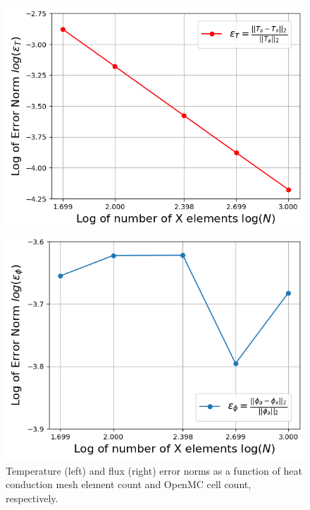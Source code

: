 \documentclass[letterpaper]{mc2023}
\begin{document}
\begin{figure}[H]
    \centering
    \begin{minipage}[b]{0.485\linewidth}
        \includegraphics[width=\linewidth]{figures/temp_error_norms.png}
    \end{minipage}
    \begin{minipage}[b]{0.485\linewidth}
        \includegraphics[width=\linewidth]{figures/flux_error_norms.png}
    \end{minipage}
    \caption{Temperature (left) and flux (right) error norms as a function of heat conduction mesh element count and OpenMC cell count, respectively.}
    \label{fig:error_study}
\end{figure}
\end{document}
